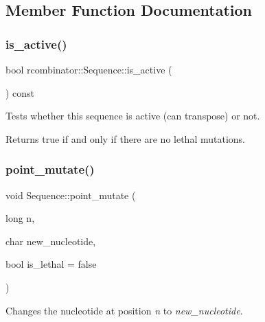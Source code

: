 \subsection{Member Function Documentation}
\mbox{\label{classrcombinator_1_1Sequence_a5af66ddd3c8bc05307b56737c56060bf}} 
\subsubsection{\texorpdfstring{is\+\_\+active()}{is\_active()}}
{\footnotesize\ttfamily bool rcombinator\+::\+Sequence\+::is\+\_\+active (\begin{DoxyParamCaption}{ }\end{DoxyParamCaption}) const\hspace{0.3cm}{\ttfamily [inline]}}



Tests whether this sequence is active (can transpose) or not. 

Returns true if and only if there are no lethal mutations. \mbox{\label{classrcombinator_1_1Sequence_a5f7bccd4725bb8c46f6b93bd01a6b2f0}} 
\subsubsection{\texorpdfstring{point\+\_\+mutate()}{point\_mutate()}}
{\footnotesize\ttfamily void Sequence\+::point\+\_\+mutate (\begin{DoxyParamCaption}\item[{long}]{n,  }\item[{char}]{new\+\_\+nucleotide,  }\item[{bool}]{is\+\_\+lethal = {\ttfamily false} }\end{DoxyParamCaption})}



Changes the nucleotide at position {\itshape n} to {\itshape new\+\_\+nucleotide}. 

